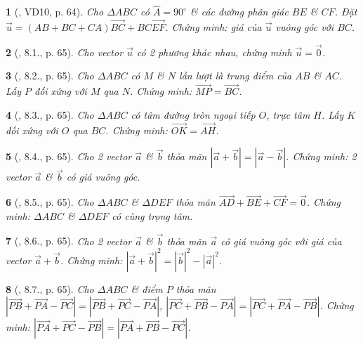 \documentclass{article}
\newtheorem{baitoan}{}
\begin{document}
\begin{baitoan}[\cite{Hai_Hung_Thu_Tung2022_tap_1}, VD10, p. 64]
	Cho $\Delta ABC$ có $\widehat{A} = 90^\circ$ \& các đường phân giác $BE$ \& $CF$. Đặt $\vec{u} = (AB + BC + CA)\overrightarrow{BC} + BC\overrightarrow{EF}$. Chứng minh: giá của $\vec{u}$ vuông góc với $BC$.
\end{baitoan}

\begin{baitoan}[\cite{Hai_Hung_Thu_Tung2022_tap_1}, 8.1., p. 65]
	Cho vector $\vec{u}$ có 2 phương khác nhau, chứng minh $\vec{u} = \vec{0}$.
\end{baitoan}

\begin{baitoan}[\cite{Hai_Hung_Thu_Tung2022_tap_1}, 8.2., p. 65]
	Cho $\Delta ABC$ có $M$ \& $N$ lần lượt là trung điểm của $AB$ \& $AC$. Lấy $P$ đối xứng với $M$ qua $N$. Chứng minh: $\overrightarrow{MP} = \overrightarrow{BC}$.
\end{baitoan}

\begin{baitoan}[\cite{Hai_Hung_Thu_Tung2022_tap_1}, 8.3., p. 65]
	Cho $\Delta ABC$ có tâm đường tròn ngoại tiếp $O$, trực tâm $H$. Lấy $K$ đối xứng với $O$ qua $BC$. Chứng minh: $\overrightarrow{OK} = \overrightarrow{AH}$.
\end{baitoan}

\begin{baitoan}[\cite{Hai_Hung_Thu_Tung2022_tap_1}, 8.4., p. 65]
	Cho 2 vector $\vec{a}$ \& $\vec{b}$ thỏa mãn $|\vec{a} + \vec{b}| = |\vec{a} - \vec{b}|$. Chứng minh: 2 vector $\vec{a}$ \& $\vec{b}$ có giá vuông góc.
\end{baitoan}

\begin{baitoan}[\cite{Hai_Hung_Thu_Tung2022_tap_1}, 8.5., p. 65]
	Cho $\Delta ABC$ \& $\Delta DEF$ thỏa mãn $\overrightarrow{AD} + \overrightarrow{BE} + \overrightarrow{CF} = \vec{0}$. Chứng minh: $\Delta ABC$ \& $\Delta DEF$ có cùng trọng tâm.
\end{baitoan}

\begin{baitoan}[\cite{Hai_Hung_Thu_Tung2022_tap_1}, 8.6., p. 65]
	Cho 2 vector $\vec{a}$ \& $\vec{b}$ thỏa mãn $\vec{a}$ có giá vuông góc với giá của vector $\vec{a} + \vec{b}$. Chứng minh: $|\vec{a} + \vec{b}|^2 = |\vec{b}|^2 - |\vec{a}|^2$.
\end{baitoan}

\begin{baitoan}[\cite{Hai_Hung_Thu_Tung2022_tap_1}, 8.7., p. 65]
	Cho $\Delta ABC$ \& điểm $P$ thỏa mãn $|\overrightarrow{PB} + \overrightarrow{PA} - \overrightarrow{PC}| = |\overrightarrow{PB} + \overrightarrow{PC} - \overrightarrow{PA}|$, $|\overrightarrow{PC} + \overrightarrow{PB} - \overrightarrow{PA}| = |\overrightarrow{PC} + \overrightarrow{PA} - \overrightarrow{PB}|$. Chứng minh: $|\overrightarrow{PA} + \overrightarrow{PC} - \overrightarrow{PB}| = |\overrightarrow{PA} + \overrightarrow{PB} - \overrightarrow{PC}|$.
\end{baitoan}
\end{document}
